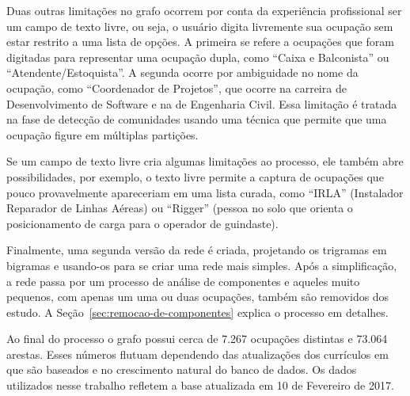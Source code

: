 \documentclass[12pt,a4paper]{article}
\begin{document}

Duas outras limitações no grafo ocorrem por conta da experiência profissional ser um campo de texto livre, ou seja, o usuário digita livremente sua ocupação sem estar restrito a uma lista de opções. A primeira se refere a ocupações que foram digitadas para representar uma ocupação dupla, como \enquote{Caixa e Balconista} ou \enquote{Atendente/Estoquista}. A segunda ocorre por ambiguidade no nome da ocupação, como \enquote{Coordenador de Projetos}, que ocorre na carreira de Desenvolvimento de Software e na de Engenharia Civil. Essa limitação é tratada na fase de detecção de comunidades usando uma técnica que permite que uma ocupação figure em múltiplas partições.

Se um campo de texto livre cria algumas limitações ao processo, ele também abre possibilidades, por exemplo, o texto livre permite a captura de ocupações que pouco provavelmente apareceriam em uma lista curada, como \enquote{IRLA} (Instalador Reparador de Linhas Aéreas) ou \enquote{Rigger} (pessoa no solo que orienta o posicionamento de carga para o operador de guindaste).

Finalmente, uma segunda versão da rede é criada, projetando os trigramas em bigramas e usando-os para se criar uma rede mais simples. Após a simplificação, a rede passa por um processo de análise de componentes e aqueles muito pequenos, com apenas um uma ou duas ocupações, também são removidos dos estudo. A Seção~\ref{sec:remocao-de-componentes} explica o processo em detalhes.

Ao final do processo o grafo possui cerca de 7.267 ocupações distintas e 73.064 arestas. Esses números flutuam dependendo das atualizações dos currículos em que são baseados e no crescimento natural do banco de dados. Os dados utilizados nesse trabalho refletem a base atualizada em 10 de Fevereiro de 2017.
\end{document}
